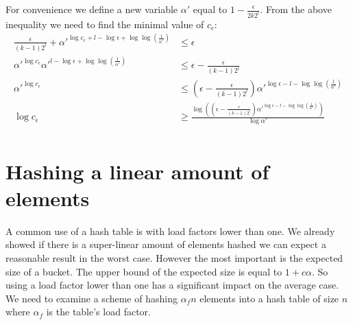 For convenience we define a new variable $\alpha'$ equal to $1 - \frac{\epsilon}{2 k 2 ^l}$. From the above inequality we need to find the minimal value of $c_\epsilon$:
\begin{displaymath}
\begin{split}
\frac{\epsilon}{(k - 1) 2 ^ l} + {\alpha'}^{\log c_\epsilon + l - \log \epsilon + \log \log \left(\frac{1}{\alpha'}\right)} & \leq \epsilon \\
{\alpha'}^{\log c_\epsilon}{\alpha'}^{l - \log \epsilon + \log \log \left(\frac{1}{\alpha'}\right)} & \leq \epsilon - \frac{\epsilon}{(k - 1) 2 ^ l} \\
{\alpha'}^{\log c_\epsilon} & \leq \left(\epsilon - \frac{\epsilon}{(k - 1) 2 ^ l}\right) {\alpha'}^{\log \epsilon - l - \log \log \left(\frac{1}{\alpha'}\right)} \\
{\log c_\epsilon} & \geq \frac{\log \left( \left( \epsilon - \frac{\epsilon}{(k - 1) 2 ^ l}\right) {\alpha'}^{\log \epsilon - l - \log \log \left(\frac{1}{\alpha'}\right)}\right)}{\log \alpha'}  \\
\end{split}
\end{displaymath}


\section{Hashing a linear amount of elements}
A common use of a hash table is with load factors lower than one. We already showed if there is a super-linear amount of elements hashed we can expect a reasonable result in the worst case. However the most important is the expected size of a bucket. The upper bound of the expected size is equal to $1 + c \alpha$. So using a load factor lower than one has a significant impact on the average case. We need to examine a scheme of hashing $\alpha_f n$ elements into a hash table of size $n$ where $\alpha_f$ is the table's load factor. 

